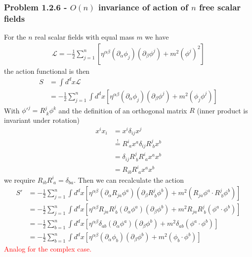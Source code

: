 \documentclass[10pt,a4paper]{book}
\theoremstyle{definition}
\begin{document}
\subsubsection{Problem 1.2.6 - \texorpdfstring{$O(n)$}{Lg} invariance of action of \texorpdfstring{$n$}{Lg} free scalar fields}
For the $n$ real scalar fields with equal mass $m$ we have
\begin{align}
    \mathcal{L}=-\frac{1}{2}\sum_{j=1}^n\left[\eta^{\alpha\beta}(\partial_\alpha\phi_j)(\partial_\beta\phi^j)+m^2(\phi^j)^2\right]
\end{align}
the action functional is then
\begin{align}
    S&=\int d^dx\mathcal{L}\\
    &=-\frac{1}{2}\sum_{j=1}^n\int d^dx\left[\eta^{\alpha\beta}(\partial_\alpha\phi_j)(\partial_\beta\phi^j)+m^2(\phi_j\phi^j)\right]
\end{align}
With $\phi'^{j}=R^j_{\;k}\phi^k$ and the definition of an orthogonal matrix $R$ (inner product is invariant under rotation)
\begin{align}
    x^ix_i&=x^i\delta_{ij}x^j\\
    &\stackrel{!}{=}R^i_{\;a}x^a\delta_{ij}R^j_{\;b}x^b\\
    &=\delta_{ij}R^j_{\;b}R^i_{\;a}x^ax^b\\
    &=R_{ib}R^i_{\;a}x^ax^b
\end{align}
we require $R_{ib}R^i_{\;a}=\delta_{ba}$. Then we can recalculate the action
\begin{align}
    S'&=-\frac{1}{2}\sum_{j=1}^n\int d^dx\left[\eta^{\alpha\beta}(\partial_\alpha R_{ja}\phi^a)(\partial_\beta R^j_{\;b}\phi^b)+m^2(R_{ja}\phi^a\cdot R^j_{\;b}\phi^b)\right]\\
    &=-\frac{1}{2}\sum_{j=1}^n\int d^dx\left[\eta^{\alpha\beta}R_{ja}R^j_{\;b}(\partial_\alpha \phi^a)(\partial_\beta \phi^b)+m^2R_{ja}R^j_{\;b}(\phi^a\cdot \phi^b)\right]\\
    &=-\frac{1}{2}\sum_{b=1}^n\int d^dx\left[\eta^{\alpha\beta}\delta_{ab}(\partial_\alpha \phi^a)(\partial_\beta \phi^b)+m^2\delta_{ab}(\phi^a\cdot \phi^b)\right]\\
    &=-\frac{1}{2}\sum_{b=1}^n\int d^dx\left[\eta^{\alpha\beta}(\partial_\alpha \phi_b)(\partial_\beta \phi^b)+m^2(\phi_b\cdot \phi^b)\right]   
\end{align}
\textcolor{red}{Analog for the complex case.}
\end{document}
